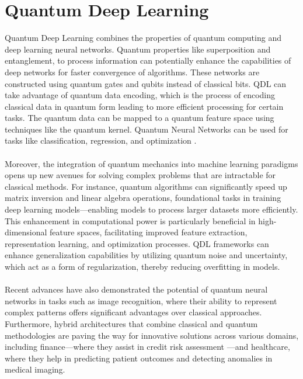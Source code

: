 \documentclass[a4paper]{article}
\begin{document}
\section{Quantum Deep Learning}

Quantum Deep Learning combines the properties of quantum computing and deep learning neural networks\cite{biamonte2017quantum}.  Quantum properties like superposition and entanglement, to process information can potentially enhance the capabilities of deep networks for faster convergence of algorithms.  These networks are constructed using quantum gates and qubits instead of classical bits. QDL can take advantage of quantum data encoding, which is the process of encoding classical data in quantum form leading to more efficient processing for certain tasks.  The quantum data can be mapped to a quantum feature space using techniques like the quantum kernel\cite{bravyi2016quantum}. Quantum Neural Networks can be used for tasks like classification, regression, and optimization . \\\\
Moreover, the integration of quantum mechanics into machine learning paradigms opens up new avenues for solving complex problems that are intractable for classical methods. For instance, quantum algorithms can significantly speed up matrix inversion and linear algebra operations\cite{cai2019quantum}, foundational tasks in training deep learning models—enabling models to process larger datasets more efficiently. This enhancement in computational power is particularly beneficial in high-dimensional feature spaces, facilitating improved feature extraction, representation learning, and optimization processes\cite{lourens2023hierarchical}. QDL frameworks can enhance generalization capabilities by utilizing quantum noise and uncertainty, which act as a form of regularization, thereby reducing overfitting in models.\\\\
Recent advances have also demonstrated the potential of quantum neural networks in tasks such as image recognition, where their ability to represent complex patterns offers significant advantages over classical approaches. Furthermore, hybrid architectures that combine classical and quantum methodologies are paving the way for innovative solutions across various domains, including finance—where they assist in credit risk assessment\cite{ORUS2019100028} \cite{Wilkens2023} \cite{Aboussalah2023} \cite{coyle2022quantum}—and healthcare, where they help in predicting patient outcomes and detecting anomalies in medical imaging.
		
\end{document}
